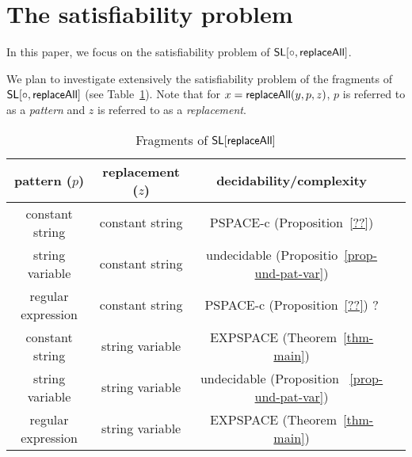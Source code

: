 

\section{The satisfiability problem} 
In this paper, we focus on the satisfiability problem of $\mathsf{SL}[\circ,\mathsf{replaceAll}]$.

\smallskip

\begin{quote}
\end{quote}
\smallskip

We plan to investigate extensively the satisfiability problem of the fragments of $\mathsf{SL}[\circ, \mathsf{replaceAll}]$ (see Table~\ref{tab-sum}). Note that for $x=\mathsf{replaceAll} (y, p, z)$, $p$ is referred to as a \emph{pattern} and $z$ is referred to as a \emph{replacement}.

\begin{table}[htbp]
\begin{tabular}{|c|c|c|c}
\hline
pattern ($p$)  &   replacement ($z$)        & decidability/complexity \\
\hline
constant string  &   constant   string                    & PSPACE-c (Proposition~\ref{??})    \\
\hline
string variable &   constant   string                    &  undecidable (Propositio~\ref{prop-und-pat-var})    \\
\hline
regular expression  &   constant string                      &    PSPACE-c (Proposition~\ref{??}) ?     \\

\hline
constant string  &   string variable                       & EXPSPACE (Theorem~\ref{thm-main})       \\

\hline
string variable  &   string variable                       & undecidable   (Proposition ~\ref{prop-und-pat-var})   \\

\hline
regular expression  &   string variable                       &      EXPSPACE (Theorem~\ref{thm-main})      \\
\hline
\end{tabular}
\caption{Fragments of $\mathsf{SL}[\mathsf{replaceAll}]$}\label{tab-sum}
\end{table}

